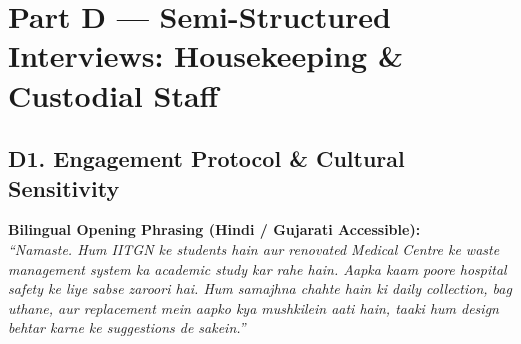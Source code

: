 \documentclass[11pt,a4paper]{article}
\begin{document}
\section{Part D --- Semi-Structured Interviews: Housekeeping \& Custodial Staff}

\subsection{D1. Engagement Protocol \& Cultural Sensitivity}
\begin{infobox}
\textbf{Bilingual Opening Phrasing (Hindi / Gujarati Accessible):}\\
\emph{``Namaste. Hum IITGN ke students hain aur renovated Medical Centre ke waste management system ka academic study kar rahe hain. Aapka kaam poore hospital safety ke liye sabse zaroori hai. Hum samajhna chahte hain ki daily collection, bag uthane, aur replacement mein aapko kya mushkilein aati hain, taaki hum design behtar karne ke suggestions de sakein.''}
\end{infobox}
\end{document}
